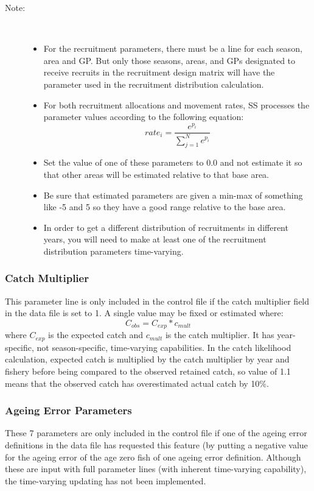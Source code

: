 \begin{description}
	\item[Note:]\
	\begin{itemize}
		\item For the recruitment parameters, there must be a line for each season, area and GP.  But only those seasons, areas, and GPs designated to receive recruits in the recruitment design matrix will have the parameter used in the recruitment distribution calculation.
		\item For both recruitment allocations and movement rates, SS processes the parameter values according to the following equation:
		\begin{equation}
			rate_i = \frac{e^{p_i}}{\sum_{j=1}^{N}e^{p_i}}
		\end{equation}
		\item Set the value of one of these parameters to 0.0 and not estimate it so that other areas will be estimated relative to that base area.
		\item Be sure that estimated parameters are given a min-max of something like -5 and 5 so they have a good range relative to the base area.
		\item In order to get a different distribution of recruitments in different years, you will need to make at least one of the recruitment distribution parameters time-varying.
	\end{itemize}
\end{description}

\subsubsection{Catch Multiplier}
This  parameter line is only included in the control file if the catch multiplier field in the data file is set to 1.  A single value may be fixed or estimated where:
\begin{equation}
C_{obs} = C_{exp} * c_{mult}
\end{equation}
where $C_{exp}$ is the expected catch and $c_{mult}$ is the catch multiplier. It has year-specific, not season-specific, time-varying capabilities.  In the catch likelihood calculation, expected catch is multiplied by the catch multiplier by year and fishery before being compared to the observed retained catch, so value of 1.1 means that the observed catch has overestimated actual catch by 10\%.

\subsubsection{Ageing Error Parameters}
These 7 parameters are only included in the control file if one of the ageing error definitions in the data file has requested this feature (by putting a negative value for the ageing error of the age zero fish of one ageing error definition.  Although these are input with full parameter lines (with inherent time-varying capability), the time-varying updating has not been implemented.

